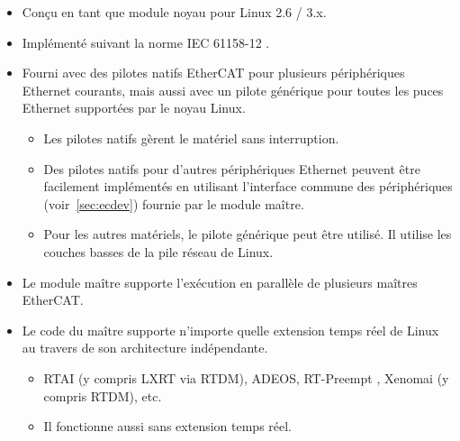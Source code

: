 \documentclass[a4paper,12pt,BCOR6mm,bibtotoc,idxtotoc]{scrbook}
\begin{document}
\begin{itemize}

\item Con\c{c}u en tant que module noyau pour Linux 2.6 / 3.x.

\item Impl\'ement\'e suivant la norme IEC 61158-12 \cite{dlspec}
  \cite{alspec}.

\item Fourni avec des pilotes natifs EtherCAT pour plusieurs
  p\'eriph\'eriques Ethernet courants, mais aussi avec un pilote
  g\'en\'erique pour toutes les puces Ethernet support\'ees par le
  noyau Linux.

  \begin{itemize}

  \item Les pilotes natifs g\`erent le mat\'eriel sans interruption.

  \item Des pilotes natifs pour d'autres p\'eriph\'eriques Ethernet
    peuvent \^etre facilement impl\'ement\'es en utilisant l'interface
    commune des p\'eriph\'eriques (voir~\autoref{sec:ecdev}) fournie
    par le module ma\^itre.

  \item Pour les autres mat\'eriels, le pilote g\'en\'erique peut
    \^etre utilis\'e.  Il utilise les couches basses de la pile
    r\'eseau de Linux.

  \end{itemize}

\item Le module ma\^itre supporte l'ex\'ecution en parall\`ele de plusieurs ma\^itres EtherCAT.

\item Le code du ma\^itre supporte n'importe quelle extension temps r\'eel de Linux
  au travers de son architecture ind\'ependante.


  \begin{itemize}

  \item RTAI \cite{rtai}
  (y compris LXRT via RTDM), ADEOS, RT-Preempt \cite{rt-preempt}, Xenomai
  (y compris RTDM), etc.

  \item Il fonctionne aussi sans extension temps r\'eel.

  \end{itemize}


\end{itemize}
\end{document}
